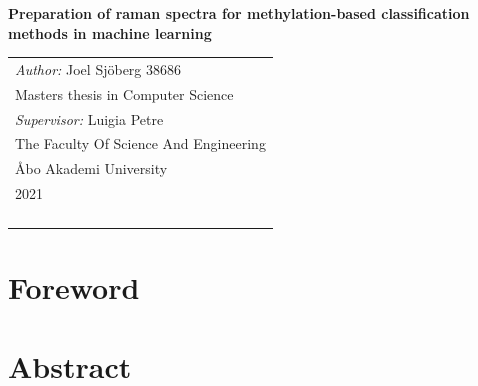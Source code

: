\documentclass[a4paper, 12pt, oneside]{book}
\begin{document}
\pagestyle{empty}    
\begingroup
{}


\begin{titlepage}
\vspace*{144pt}
\begin{center}
\Huge\bf Preparation of raman spectra for methylation-based classification methods in machine learning


\end{center}
\enlargethispage{3cm}
\vfill

\hfill
\begin{tabular}[t]{l@{}}%
\textit{Author:} Joel Sjöberg 38686\\ %
Masters thesis in Computer Science\\ %
\textit{Supervisor:} Luigia Petre\\ %
The Faculty Of Science And Engineering\\ %
Åbo Akademi University\\ 
2021\\ %
\\
\\
\\
\\
\end{tabular}
\end{titlepage}


\tableofcontents 


\endgroup %

\clearpage
\pagestyle{plain}      
\chapter*{Foreword}


\chapter*{Abstract}

\end{document}
